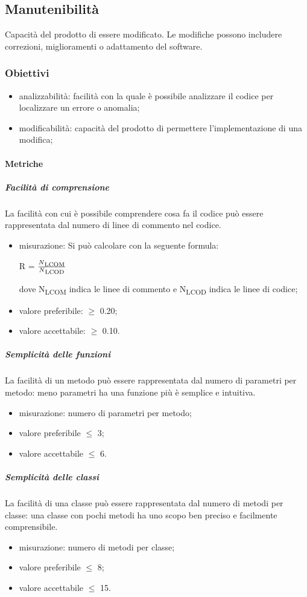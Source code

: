 	\subsection{Manutenibilità}
	Capacità del prodotto di essere modificato. Le modifiche possono includere correzioni, miglioramenti o adattamento del software.
		\subsubsection{Obiettivi}
		\begin{itemize}
			\item analizzabilità: facilità con la quale è possibile analizzare il codice per localizzare un errore o anomalia;
			\item modificabilità: capacità del prodotto di permettere l'implementazione di una modifica;
		\end{itemize}
		\paragraph{Metriche}
			\subparagraph{Facilità di comprensione}
			La facilità con cui è possibile comprendere cosa fa il codice può essere rappresentata dal numero di linee di commento nel codice.
			\begin{itemize}
			\item misurazione: Si può calcolare con la seguente formula: \\
			\centerline{R = \(\frac{N\textsubscript{LCOM}}{N\textsubscript{LCOD}} \) }
			dove N\textsubscript{LCOM} indica le linee di commento e N\textsubscript{LCOD} indica le linee di codice;
			\item valore preferibile: $\geq$ 0.20;
			\item valore accettabile: $\geq$ 0.10.
			\end{itemize}
			\subparagraph{Semplicità delle funzioni}
			La facilità di un metodo può essere rappresentata dal numero di parametri per metodo: meno parametri ha una funzione più è semplice e intuitiva.
			\begin{itemize}
			\item misurazione: numero di parametri per metodo;
			\item valore preferibile $\leq$ 3;
			\item valore accettabile $\leq$ 6.
			\end{itemize}
			\subparagraph{Semplicità delle classi}
			La facilità di una classe può essere rappresentata dal numero di metodi per classe: una classe con pochi metodi ha uno scopo ben preciso e facilmente comprensibile.
			\begin{itemize}
			\item misurazione: numero di metodi per classe;
			\item valore preferibile $\leq$ 8;
			\item valore accettabile $\leq$ 15.
			\end{itemize}			
			
